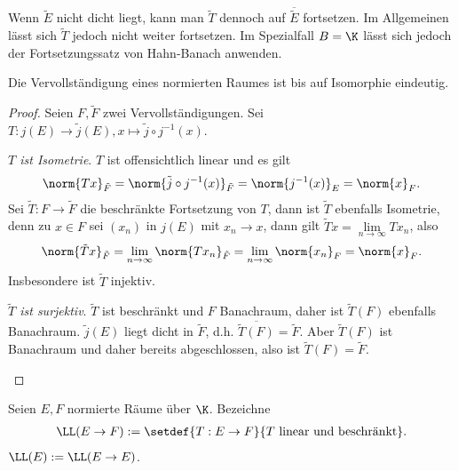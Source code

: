 \begin{bem}
\label{bem:2.6}
Wenn $\tilde{E}$ nicht dicht liegt, kann man $\tilde{T}$ dennoch auf
$\overline{\tilde{E}}$ fortsetzen. Im Allgemeinen lässt sich $\tilde{T}$ jedoch
nicht weiter fortsetzen. Im Spezialfall $B=\K$ lässt sich jedoch der
Fortsetzungssatz von Hahn-Banach anwenden.\maphere
\end{bem}

\begin{cor}
\label{prop:2.7}
Die Vervollständigung eines normierten Raumes ist bis auf Isomorphie
eindeutig.\fishhere
\end{cor}
\begin{proof}
Seien $F,\tilde{F}$ zwei Vervollständigungen. Sei $T: j(E)\to \tilde{j}(E),
x\mapsto \tilde{j}\circ j^{-1}(x)$.
\begin{proofenum}
  \item \textit{$T$ ist Isometrie}. $T$ ist offensichtlich linear und es gilt
\begin{align*}
\norm{Tx}_{\tilde{F}} = \norm{\tilde{j}\circ j^{-1}(x)}_{\tilde{F}} =
  \norm{j^{-1}(x)}_E = \norm{x}_F.
\end{align*}
Sei $\tilde{T}:F\to\tilde{F}$ die beschränkte Fortsetzung von $T$, dann
ist $\tilde{T}$ ebenfalls Isometrie, denn zu $x\in F$ sei $(x_n)$ in $j(E)$ mit
$x_n\to x$, dann gilt $\tilde{T}x = \lim\limits_{n\to\infty} Tx_n$, also
\begin{align*}
\norm{\tilde{T}x}_{\tilde{F}} = \lim\limits_{n\to\infty}\norm{Tx_n}_{\tilde{F}}
= \lim\limits_{n\to\infty} \norm{x_n}_F = \norm{x}_F.
\end{align*}
Insbesondere ist $\tilde{T}$ injektiv.
\item \textit{$\tilde{T}$ ist surjektiv}. $\tilde{T}$ ist beschränkt und $F$
Banachraum, daher ist $\tilde{T}(F)$ ebenfalls Banachraum. $\tilde{j}(E)$ liegt
dicht in $\tilde{F}$, d.h. $\overline{\tilde{T}(F)} = \tilde{F}$. Aber
$\tilde{T}(F)$ ist Banachraum und daher bereits abgeschlossen, also ist
$\tilde{T}(F) = \tilde{F}$.\qedhere
\end{proofenum}
\end{proof}

\begin{defn}
\label{defn:2.8}
Seien $E,F$ normierte Räume über $\K$. Bezeichne
\begin{align*}
\LL(E\to F) := \setdef{T:E\to F}{T\text{ linear und beschränkt}}.
\end{align*}
$\LL(E):=\LL(E\to E)$.\fishhere
\end{defn}

